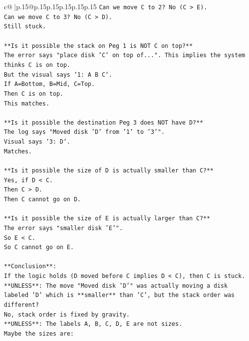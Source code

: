 \documentclass{article}
\begin{document}
{\begin{supertabular}{c@{$\;$}|p{.15\linewidth}@{}p{.15\linewidth}p{.15\linewidth}p{.15\linewidth}p{.15\linewidth}p{.15\linewidth}}
{{{\texttt{Can we move C to 2? No (C > E).} \\
\texttt{Can we move C to 3? No (C > D).} \\
\texttt{Still stuck.} \\
\\ 
\texttt{**Is it possible the stack on Peg 1 is NOT C on top?**} \\
\texttt{The error says "place disk 'C' on top of...". This implies the system thinks C is on top.} \\
\texttt{But the visual says `1: A B C`.} \\
\texttt{If A=Bottom, B=Mid, C=Top.} \\
\texttt{Then C is on top.} \\
\texttt{This matches.} \\
\\ 
\texttt{**Is it possible the destination Peg 3 does NOT have D?**} \\
\texttt{The log says "Moved disk 'D' from '1' to '3'".} \\
\texttt{Visual says `3: D`.} \\
\texttt{Matches.} \\
\\ 
\texttt{**Is it possible the size of D is actually smaller than C?**} \\
\texttt{Yes, if D < C.} \\
\texttt{Then C > D.} \\
\texttt{Then C cannot go on D.} \\
\\ 
\texttt{**Is it possible the size of E is actually larger than C?**} \\
\texttt{The error says "smaller disk 'E'".} \\
\texttt{So E < C.} \\
\texttt{So C cannot go on E.} \\
\\ 
\texttt{**Conclusion**:} \\
\texttt{If the logic holds (D moved before C implies D < C), then C is stuck.} \\
\texttt{**UNLESS**: The move "Moved disk 'D'" was actually moving a disk labeled 'D' which is **smaller** than 'C', but the stack order was different?} \\
\texttt{No, stack order is fixed by gravity.} \\
\texttt{**UNLESS**: The labels A, B, C, D, E are not sizes.} \\
\texttt{Maybe the sizes are:} \\
}}}
\end{supertabular}}
\end{document}
